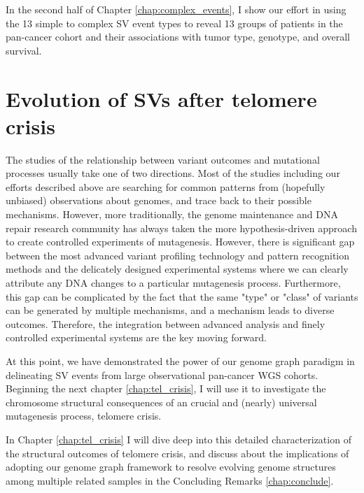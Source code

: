 \documentclass[phd,tocprelim]{cornell}
\begin{document}
\clearpage
In the second half of Chapter \ref{chap:complex_events}, I show our effort in using the 13 simple to complex SV event types to reveal 13 groups of patients in the pan-cancer cohort and their associations with tumor type, genotype, and overall survival. 

\section{Evolution of SVs after telomere crisis}
The studies of the relationship between variant outcomes and mutational processes usually take one of two directions. Most of the studies including our efforts described above are searching for common patterns from (hopefully unbiased) observations about genomes, and trace back to their possible mechanisms. However, more traditionally, the genome maintenance and DNA repair research community has always taken the more hypothesis-driven approach to create controlled experiments of mutagenesis. However, there is significant gap between the most advanced variant profiling technology and pattern recognition methods and the delicately designed experimental systems where we can clearly attribute any DNA changes to a particular mutagenesis process. Furthermore, this gap can be complicated by the fact that the same "type" or "class" of variants can be generated by multiple mechanisms, and a mechanism leads to diverse outcomes. Therefore, the integration between advanced analysis and finely controlled experimental systems are the key moving forward.

At this point, we have demonstrated the power of our genome graph paradigm in delineating SV events from large observational pan-cancer WGS cohorts. Beginning the next chapter \ref{chap:tel_crisis}, I will use it to investigate the chromosome structural consequences of an crucial and (nearly) universal mutagenesis process, telomere crisis.


In Chapter \ref{chap:tel_crisis} I will dive deep into this detailed characterization of the structural outcomes of telomere crisis, and discuss about the implications of adopting our genome graph framework to resolve evolving genome structures among multiple related samples in the Concluding Remarks \ref{chap:conclude}.
\end{document}
